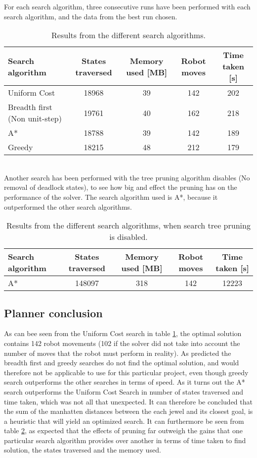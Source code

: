 For each search algorithm, three consecutive runs have been performed with each search algorithm, and the data from the best run chosen.\\

\begin{table}[h!]
	\centering
	\begin{tabular}{| l | c | c | c | c | }
		\hline
			Search algorithm	& States traversed & Memory used [MB] & Robot moves & Time taken [s]\\ \hline
	    	Uniform Cost & 18968 			& 39 		 & 142 	& 202\\\hline
		    Breadth first (Non unit-step)	& 19761 			& 40 		 & 162 	& 218\\\hline
		    A*		& 18788 			& 39 		 & 142 	& 189 \\\hline
	    	Greedy 		& 18215 			& 48 		 & 212 	& 179 \\
		\hline
	\end{tabular}
	\label{tbl:searchresults}
	\caption{Results from the different search algorithms.}
\end{table}
\\
Another search has been performed with the tree pruning algorithm disables (No removal of deadlock states), to see how big and effect the pruning has on the performance of the solver. The search algorithm used is A*, because it outperformed the other search algorithms.\\
\begin{table}[h!]
	\centering
	\begin{tabular}{| l | c | c | c | c | }
		\hline
			Search algorithm	& States traversed & Memory used [MB] & Robot moves & Time taken [s]\\ \hline
		    A*		& 148097 			& 318 		 & 142 	& 12223 \\
		\hline
	\end{tabular}
	\label{tbl:searchresultsnoprun}
	\caption{Results from the different search algorithms, when search tree pruning is disabled.}
\end{table}


\subsection{Planner conclusion}
As can bee seen from the Uniform Cost search in table \ref{tbl:searchresults}, the optimal solution contains 142 robot movements (102 if the solver did not take into account the number of moves that the robot must perform in reality). As predicted the breadth first and greedy searches do not find the optimal solution, and would therefore not be applicable to use for this particular project, even though greedy search outperforms the other searches in terms of speed. As it turns out the A* search outperforms the Uniform Cost Search in number of states traversed and time taken, which was not all that unexpected. It can therefore be concluded that the sum of the manhatten distances between the each jewel and its closest goal, is a heuristic that will yield an optimized search. It can furthermore be seen from table \ref{tbl:searchresultsnoprun}, as expected that the effects of pruning far outweigh the gains that one particular search algorithm provides over another in terms of time taken to find solution, the states traversed and the memory used.
